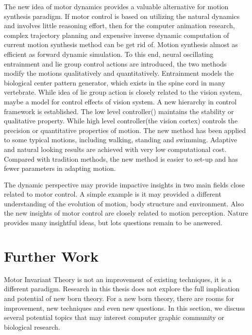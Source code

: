 The new idea of motor dynamics provides a valuable alternative for motion synthesis paradigm.
If motor control is based on utilizing the natural dynamics and involves little reasoning effort,
then for  the computer animation research, complex trajectory planning and expensive inverse dynamic computation of current motion synthesis method can be get rid of.
Motion synthesis almost as efficient as forward dynamic simulation.
To this end, neural oscillating entrainment and lie group control actions are introduced, the two methods modify the motions qualitatively and quantitatively.
Entrainment  models the biological center pattern generator, which exists in the spine cord in many vertebrate.
While idea of lie group action is closely related to the vision system, maybe a model for control effects of vision system.
A new hierarchy in control framework is established.
The low level controller(\cpg) maintains the stability or qualitative property.
While high level controller(the vision cortex) controls the precision or quantitative properties of motion.
The new method has been applied to some typical motions, including walking, standing and swimming.
Adaptive and natural looking results are achieved with very low computational cost.
Compared with tradition methods, the new method is easier to set-up and has fewer parameters in adapting motion.


The dynamic perspective may provide impactive insights in two main fields close related to motor control.
A simple example is it may provided a different understanding of the evolution of motion, body structure and environment.
Also the new insights of motor control are closely related to motion perception.
Nature provides many insightful ideas, but lots questions remain to be answered.













 




\section{Further Work}
Motor Invariant Theory is not an improvement of existing \cms techniques, it is a different paradigm.
Research in this thesis does not explore the full implication and potential of new born theory.
For a new born theory, there are rooms for improvement, new techniques and even new questions.
In this section, we discuss several potential topics that may interest computer graphic community or biological research.


